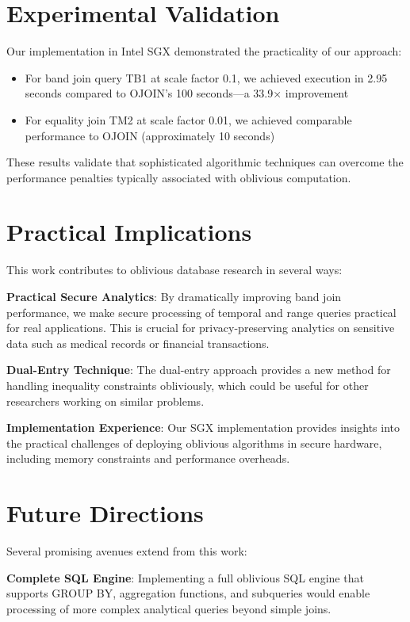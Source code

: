 \section{Experimental Validation}

Our implementation in Intel SGX demonstrated the practicality of our approach:

\begin{itemize}
\item For band join query TB1 at scale factor 0.1, we achieved execution in 2.95 seconds compared to OJOIN's 100 seconds—a 33.9× improvement
\item For equality join TM2 at scale factor 0.01, we achieved comparable performance to OJOIN (approximately 10 seconds)
\end{itemize}

These results validate that sophisticated algorithmic techniques can overcome the performance penalties typically associated with oblivious computation.

\section{Practical Implications}

This work contributes to oblivious database research in several ways:

\textbf{Practical Secure Analytics}: By dramatically improving band join performance, we make secure processing of temporal and range queries practical for real applications. This is crucial for privacy-preserving analytics on sensitive data such as medical records or financial transactions.

\textbf{Dual-Entry Technique}: The dual-entry approach provides a new method for handling inequality constraints obliviously, which could be useful for other researchers working on similar problems.

\textbf{Implementation Experience}: Our SGX implementation provides insights into the practical challenges of deploying oblivious algorithms in secure hardware, including memory constraints and performance overheads.

\section{Future Directions}

Several promising avenues extend from this work:

\textbf{Complete SQL Engine}: Implementing a full oblivious SQL engine that supports GROUP BY, aggregation functions, and subqueries would enable processing of more complex analytical queries beyond simple joins.

